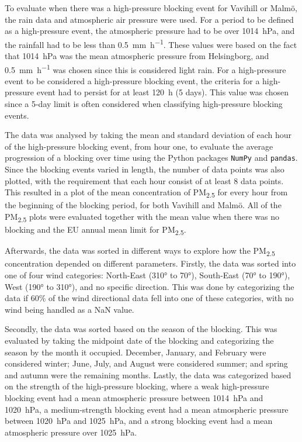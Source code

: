 To evaluate when there was a high-pressure blocking event for Vavihill or Malmö, the rain data and atmospheric air pressure were used. For a period to be defined as a high-pressure event, the atmospheric pressure had to be over \SI{1014}{\hecto\pascal}, and the rainfall had to be less than \SI{0.5}{\mm\per\hour}. These values were based on the fact that \SI{1014}{\hecto\pascal} was the mean atmospheric pressure from Helsingborg, and \SI{0.5}{\mm\per\hour} was chosen since this is considered light rain. For a high-pressure event to be considered a high-pressure blocking event, the criteria for a high-pressure event had to persist for at least \SI{120}{\hour} (5 days). This value was chosen since a 5-day limit is often considered when classifying high-pressure blocking events.

The data was analysed by taking the mean and standard deviation of each hour of the high-pressure blocking event, from hour one, to evaluate the average progression of a blocking over time using the Python packages \texttt{NumPy} and \texttt{pandas}. Since the blocking events varied in length, the number of data points was also plotted, with the requirement that each hour consist of at least 8 data points. This resulted in a plot of the mean concentration of PM\textsubscript{2.5} for every hour from the beginning of the blocking period, for both Vavihill and Malmö. All of the PM\textsubscript{2.5} plots were evaluated together with the mean value when there was no blocking and the EU annual mean limit for PM\textsubscript{2.5}.

Afterwards, the data was sorted in different ways to explore how the PM\textsubscript{2.5} concentration depended on different parameters. Firstly, the data was sorted into one of four wind categories: North-East (310° to 70°), South-East (70° to 190°), West (190° to 310°), and no specific direction. This was done by categorizing the data if 60\% of the wind directional data fell into one of these categories, with no wind being handled as a NaN value.

Secondly, the data was sorted based on the season of the blocking. This was evaluated by taking the midpoint date of the blocking and categorizing the season by the month it occupied. December, January, and February were considered winter; June, July, and August were considered summer; and spring and autumn were the remaining months. Lastly, the data was categorized based on the strength of the high-pressure blocking, where a weak high-pressure blocking event had a mean atmospheric pressure between \SI{1014}{\hecto\pascal} and \SI{1020}{\hecto\pascal}, a medium-strength blocking event had a mean atmospheric pressure between \SI{1020}{\hecto\pascal} and \SI{1025}{\hecto\pascal}, and a strong blocking event had a mean atmospheric pressure over \SI{1025}{\hecto\pascal}.

